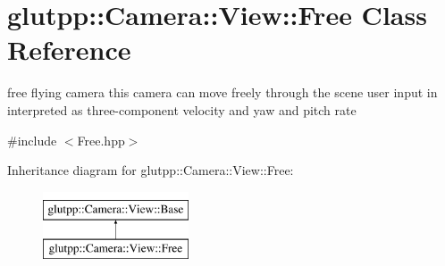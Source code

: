 \hypertarget{classglutpp_1_1Camera_1_1View_1_1Free}{\section{glutpp\-:\-:\-Camera\-:\-:\-View\-:\-:\-Free \-Class \-Reference}
\label{classglutpp_1_1Camera_1_1View_1_1Free}
}


free flying camera this camera can move freely through the scene user input in interpreted as three-\/component velocity and yaw and pitch rate  




{\ttfamily \#include $<$\-Free.\-hpp$>$}

\-Inheritance diagram for glutpp\-:\-:\-Camera\-:\-:\-View\-:\-:\-Free\-:\begin{figure}[H]
\begin{center}
\leavevmode
\includegraphics[height=2.000000cm]{classglutpp_1_1Camera_1_1View_1_1Free}
\end{center}
\end{figure}
